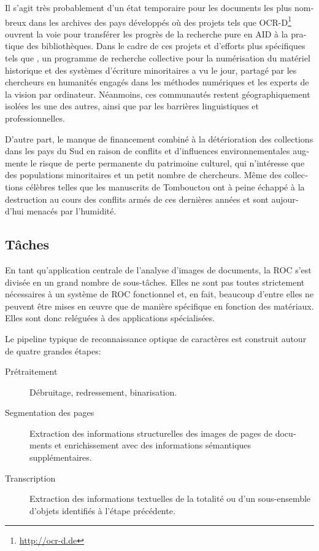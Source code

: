 \begin{french}
Il s'agit très probablement d'un état temporaire pour les documents les plus nombreux dans les archives des
pays développés où des projets tels que OCR-D\footnote{\url{http://ocr-d.de}}
ouvrent la voie pour transférer les progrès de la recherche pure en AID à la
pratique des bibliothèques. Dans le cadre de ces projets et d'efforts plus
spécifiques tels que \cite{smith2018research}, un programme de recherche collective pour la numérisation du matériel historique
et des systèmes d'écriture minoritaires a vu le jour, partagé par les chercheurs en 
humanités engagés dans les méthodes numériques et les experts de la vision par
ordinateur. Néanmoins, ces communautés restent géographiquement isolées les une des autres, ainsi que par les barrières linguistiques et professionnelles.

D'autre part, le manque de financement combiné à la détérioration des
collections dans les pays du Sud en raison de conflits et d'influences
environnementales augmente le risque de perte permanente du patrimoine culturel,
qui n'intéresse que des populations minoritaires et un petit nombre de chercheurs. 
Même des collections célèbres telles que les manuscrits de
Tombouctou ont à peine échappé à la destruction au cours des conflits armés de ces
dernières années et sont aujourd'hui menacés par l'humidité. 

\subsection{Tâches}

En tant qu'application centrale de l'analyse d'images de documents, la ROC
s'est divisée en un grand nombre de sous-tâches. Elles ne sont pas toutes
strictement nécessaires à un système de ROC fonctionnel et, en fait, beaucoup
d'entre elles ne peuvent être mises en œuvre que de manière spécifique en fonction des
matériaux. Elles sont donc reléguées à des applications spécialisées.

Le pipeline typique de reconnaissance optique de caractères est construit
autour de quatre grandes étapes:

\begin{description}
\item [Prétraitement] Débruitage, redressement, binarisation.
\item [Segmentation des pages] Extraction des informations structurelles des
images de pages de documents et enrichissement avec des informations sémantiques
supplémentaires.
\item [Transcription] Extraction des informations textuelles de la totalité ou
d'un sous-ensemble d'objets identifiés à l'étape précédente.
\end{description}


\end{french}
